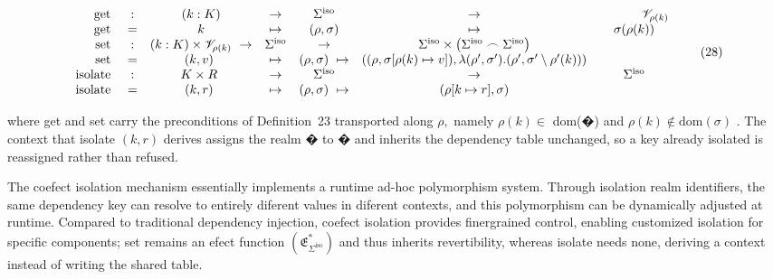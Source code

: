 \documentclass[
  10
]{article}
\newcounter{none} %
\begin{document}
\[
{ \begin{array} { r c c c c c c } { \operatorname { g e t } \ } & { : } & { ( k : K ) } & { \to } & { \Sigma ^ { \mathrm { i s o } } } & { \to } & { \ \qquad \quad \mathscr { V } _ { \rho ( k ) } } \\ { \operatorname { g e t } \ } & { = } & { k } & { \mapsto } & { ( \rho , \sigma ) } & { \mapsto } & { \sigma ( \rho ( k ) ) } \\ { \operatorname { s e t } \ } & { : } & { ( k : K ) \times \mathscr { V } _ { \rho ( k ) } \ \to } & { \Sigma ^ { \mathrm { i s o } } } & { \to } & { \Sigma ^ { \mathrm { i s o } } \times \left( \Sigma ^ { \mathrm { i s o } } \frown \Sigma ^ { \mathrm { i s o } } \right) } \\ { \operatorname { s e t } \ } & { = } & { ( k , v ) \ } & { \mapsto } & { ( \rho , \sigma ) \ \mapsto } & { ( ( \rho , \sigma [ \rho ( k ) \mapsto v ] ) , \lambda ( \rho ^ { \prime } , \sigma ^ { \prime } ) . ( \rho ^ { \prime } , \sigma ^ { \prime } \setminus \rho ^ { \prime } ( k ) ) ) } \\ { \operatorname { i s o l a t e } \ } & { : } & { K \times R \ } & { \to } & { \Sigma ^ { \mathrm { i s o } } } & { \to } & { \Sigma ^ { \mathrm { i s o } } } \\ { \operatorname { i s o l a t e } \ } & { = } & { ( k , r ) \ } & { \mapsto } & { ( \rho , \sigma ) \ \mapsto } & { ( \rho [ k \mapsto r ] , \sigma ) } \end{array} }\tag{28}
\]

where get and set carry the preconditions of Definition~23 transported
along \(\rho ,\) namely \(\rho ( k ) \in\) dom(�) and
\(\rho ( k ) \notin \mathrm { d o m } ( \sigma )\) . The context that
isolate \(( k , r )\) derives assigns the realm � to � and inherits the
dependency table unchanged, so a key already isolated is reassigned
rather than refused.

The coefect isolation mechanism essentially implements a runtime ad-hoc
polymorphism system. Through isolation realm identifiers, the same
dependency key can resolve to entirely diferent values in diferent
contexts, and this polymorphism can be dynamically adjusted at runtime.
Compared to traditional dependency injection, coefect isolation provides
finergrained control, enabling customized isolation for specific
components; set remains an efect function
\(\left( \mathfrak { E } _ { \Sigma ^ { \mathrm { { i s o } } } } ^ { * } \right)\)
and thus inherits revertibility, whereas isolate needs none, deriving a
context instead of writing the shared table.
\end{document}
